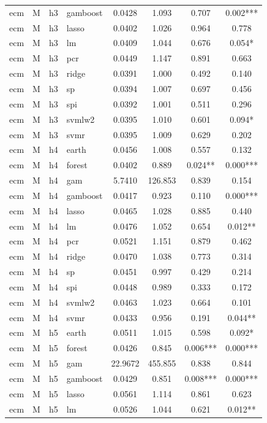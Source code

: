 \begin{ThreePartTable}
\begin{longtable}[t]{llclcccc}
ecm & M & h3 & gamboost & 0.0428 & 1.093 & 0.707 & 0.002***\\
ecm & M & h3 & lasso & 0.0402 & 1.026 & 0.964 & 0.778\\
ecm & M & h3 & lm & 0.0409 & 1.044 & 0.676 & 0.054*\\
ecm & M & h3 & pcr & 0.0449 & 1.147 & 0.891 & 0.663\\
ecm & M & h3 & ridge & 0.0391 & 1.000 & 0.492 & 0.140\\
ecm & M & h3 & sp & 0.0394 & 1.007 & 0.697 & 0.456\\
ecm & M & h3 & spi & 0.0392 & 1.001 & 0.511 & 0.296\\
ecm & M & h3 & svmlw2 & 0.0395 & 1.010 & 0.601 & 0.094*\\
ecm & M & h3 & svmr & 0.0395 & 1.009 & 0.629 & 0.202\\
\addlinespace
ecm & M & h4 & earth & 0.0456 & 1.008 & 0.557 & 0.132\\
ecm & M & h4 & forest & 0.0402 & 0.889 & 0.024** & 0.000***\\
ecm & M & h4 & gam & 5.7410 & 126.853 & 0.839 & 0.154\\
ecm & M & h4 & gamboost & 0.0417 & 0.923 & 0.110 & 0.000***\\
ecm & M & h4 & lasso & 0.0465 & 1.028 & 0.885 & 0.440\\
ecm & M & h4 & lm & 0.0476 & 1.052 & 0.654 & 0.012**\\
ecm & M & h4 & pcr & 0.0521 & 1.151 & 0.879 & 0.462\\
ecm & M & h4 & ridge & 0.0470 & 1.038 & 0.773 & 0.314\\
ecm & M & h4 & sp & 0.0451 & 0.997 & 0.429 & 0.214\\
ecm & M & h4 & spi & 0.0448 & 0.989 & 0.333 & 0.172\\
ecm & M & h4 & svmlw2 & 0.0463 & 1.023 & 0.664 & 0.101\\
ecm & M & h4 & svmr & 0.0433 & 0.956 & 0.191 & 0.044**\\
\addlinespace
ecm & M & h5 & earth & 0.0511 & 1.015 & 0.598 & 0.092*\\
ecm & M & h5 & forest & 0.0426 & 0.845 & 0.006*** & 0.000***\\
ecm & M & h5 & gam & 22.9672 & 455.855 & 0.838 & 0.844\\
ecm & M & h5 & gamboost & 0.0429 & 0.851 & 0.008*** & 0.000***\\
ecm & M & h5 & lasso & 0.0561 & 1.114 & 0.861 & 0.623\\
ecm & M & h5 & lm & 0.0526 & 1.044 & 0.621 & 0.012**\\

\end{longtable}
\end{ThreePartTable}
